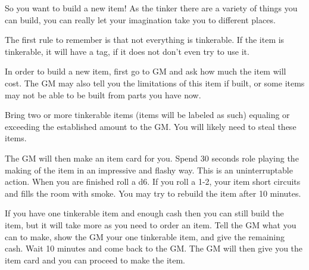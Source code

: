 \documentclass[green]{LRSguildcamp1}
\begin{document}
\name{\gTinkering{}}

So you want to build a new item! As the tinker there are a variety of things you can build, you can really let your imagination take you to different places. 

The first rule to remember is that not everything is tinkerable. If the item is tinkerable, it will have a tag, if it does not don't even try to use it. 

In order to build a new item, first go to GM and ask how much the item will cost. The GM may also tell you the limitations of this item if built, or some items may not be able to be built from parts you have now.   

Bring two or more tinkerable items (items will be labeled as such) equaling or exceeding the established amount to the GM. You will likely need to steal these items. 

The GM will then make an item card for you. Spend 30 seconds role playing the making of the item in an impressive and flashy way. This is an uninterruptable action. When you are finished roll a d6.  If you roll a 1-2, your item short circuits and fills the room with smoke. You may try to rebuild the item after 10 minutes. 

If you have one tinkerable item and enough cash then you can still build the item, but it will take more as you need to order an item. Tell the GM what you can to make, show the GM your one tinkerable item, and give the remaining cash. Wait 10 minutes and come back to the GM. The GM will then give you the item card and you can proceed to make the item. 

\end{document}
